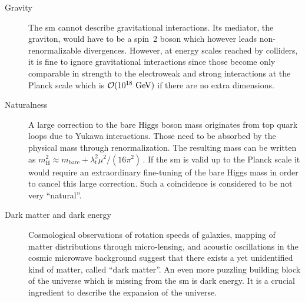 \begin{description}
\item[Gravity] The \gls{sm} cannot describe gravitational interactions. Its mediator, the graviton, would have to be a spin~2 boson which however leads non-renormalizable divergences. However, at energy scales reached by colliders, it is fine to ignore gravitational interactions since those become only comparable in strength to the electroweak and strong interactions at the Planck scale which is $\mathcal{O}(10^{18}~\textrm{GeV})$ if there are no extra dimensions.
\item[Naturalness] A large correction to the bare Higgs boson mass originates from top quark loops due to Yukawa interactions. Those need to be absorbed by the physical mass through renormalization. The resulting mass can be written as $m^{2}_\mathrm{H}\approx m_\mathrm{bare}+\lambda_\mathrm{t}^{2}\mu^2/(16\pi^2)\,$. If the \gls{sm} is valid up to the Planck scale it would require an extraordinary fine-tuning of the bare Higgs mass in order to cancel this large correction. Such a coincidence is considered to be not very ``natural''.
\item[Dark matter and dark energy] Cosmological observations of rotation speeds of galaxies, mapping of matter distributions through micro-lensing, and acoustic oscillations in the cosmic microwave background suggest that there exists a yet unidentified kind of matter, called ``dark matter''. An even more puzzling building block of the universe which is missing from the \gls{sm} is dark energy. It is a crucial ingredient to describe the expansion of the universe.

\end{description}

